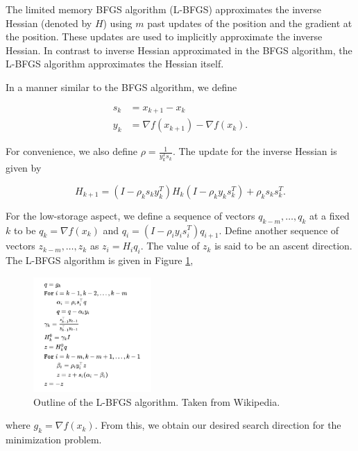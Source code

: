 
The limited memory BFGS algorithm (L-BFGS) approximates the inverse Hessian (denoted by $H$) using $m$ past updates of 
the position and the gradient at the position. These updates are used to implicitly approximate the inverse Hessian. In 
contrast to inverse Hessian approximated in the BFGS algorithm, the L-BFGS algorithm approximates the Hessian itself.


In a manner similar to the BFGS algorithm, we define

\begin{align*}
    s_k &= x_{k+1} - x_k\\
    y_k &= \nabla f(x_{k+1}) - \nabla f(x_k).
\end{align*}

\noindent For convenience, we also define $\rho = \frac{1}{y_k^Ts_k}$. The update for the inverse Hessian is given by

$$
    H_{k+1} = (I - \rho_ks_ky_k^T)H_k(I - \rho_ky_ks_k^T) + \rho_ks_ks_k^T.
$$

For the low-storage aspect, we define a sequence of vectors $q_{k-m}, \dots, q_k$ at a fixed $k$ to be 
$q_k = \nabla f(x_k)$ and $q_i = (I - \rho_iy_is_i^T)q_{i+1}$. Define another sequence of vectors $z_{k-m},\dots, z_k$ 
as $z_i = H_iq_i$. The value of $z_k$ is said to be an ascent direction. The L-BFGS algorithm is given in Figure 
\ref{fig:L-BFGS-Algorithm},

\begin{figure}[h]
    \centering
    \includegraphics[width=0.40\textwidth]{images/L-BFGS-Algorithm.png}
    \caption{Outline of the L-BFGS algorithm. Taken from Wikipedia.}
    \label{fig:L-BFGS-Algorithm}
\end{figure}

\noindent where $g_k = \nabla f(x_k)$. From this, we obtain our desired search direction for the minimization problem.